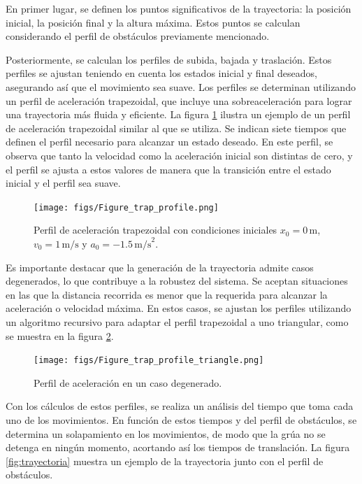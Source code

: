 \documentclass{article}
\begin{document}
            En primer lugar, se definen los puntos significativos de la trayectoria: la posición inicial, la posición final y la altura máxima. Estos puntos se calculan considerando el perfil de obstáculos previamente mencionado.

            Posteriormente, se calculan los perfiles de subida, bajada y traslación. Estos perfiles se ajustan teniendo en cuenta los estados inicial y final deseados, asegurando así que el movimiento sea suave. Los perfiles se determinan utilizando un perfil de aceleración trapezoidal, que incluye una sobreaceleración para lograr una trayectoria más fluida y eficiente. La figura \ref{fig:perfil} ilustra un ejemplo de un perfil de aceleración trapezoidal similar al que se utiliza. Se indican siete tiempos que definen el perfil necesario para alcanzar un estado deseado. En este perfil, se observa que tanto la velocidad como la aceleración inicial son distintas de cero, y el perfil se ajusta a estos valores de manera que la transición entre el estado inicial y el perfil sea suave.

            \begin{figure}[H]
                \centering
                \texttt{[image: figs/Figure\_trap\_profile.png]}
                \caption{Perfil de aceleración trapezoidal con condiciones iniciales \(x_0=0 \, \text{m}\), \(v_0=1 \, \text{m/s}\) y \(a_0=-1.5 \, \text{m/s}^2\).}
                \label{fig:perfil}
            \end{figure}

            Es importante destacar que la generación de la trayectoria admite casos degenerados, lo que contribuye a la robustez del sistema. Se aceptan situaciones en las que la distancia recorrida es menor que la requerida para alcanzar la aceleración o velocidad máxima. En estos casos, se ajustan los perfiles utilizando un algoritmo recursivo para adaptar el perfil trapezoidal a uno triangular, como se muestra en la figura \ref{fig:perfilTriangular}.

            \begin{figure}[H]
                \centering
                \texttt{[image: figs/Figure\_trap\_profile\_triangle.png]}
                \caption{Perfil de aceleración en un caso degenerado.}
                \label{fig:perfilTriangular}
            \end{figure}

            Con los cálculos de estos perfiles, se realiza un análisis del tiempo que toma cada uno de los movimientos. En función de estos tiempos y del perfil de obstáculos, se determina un solapamiento en los movimientos, de modo que la grúa no se detenga en ningún momento, acortando así los tiempos de translación. La figura \ref{fig:trayectoria} muestra un ejemplo de la trayectoria junto con el perfil de obstáculos.
\end{document}
